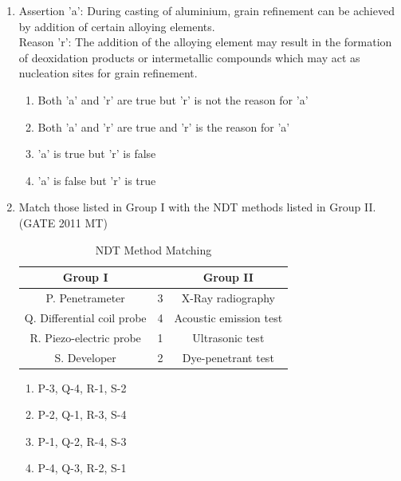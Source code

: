 \documentclass[12pt]{article}
\begin{document}
\begin{enumerate}
\item Assertion 'a': During casting of aluminium, grain refinement can be achieved by addition of certain alloying elements. \\
Reason 'r': The addition of the alloying element may result in the formation of deoxidation products or intermetallic compounds which may act as nucleation sites for grain refinement.
    \begin{enumerate}
        \item Both 'a' and 'r' are true but 'r' is not the reason for 'a'
        \item Both 'a' and 'r' are true and 'r' is the reason for 'a'
        \item 'a' is true but 'r' is false
        \item 'a' is false but 'r' is true
    \end{enumerate}

\item Match those listed in Group I with the NDT methods listed in Group II.(GATE 2011 MT)
\begin{table}[h]
\centering
\caption{NDT Method Matching}
\begin{tabular}{|c|c|c|}
\hline
\textbf{Group I} & & \textbf{Group II} \\
\hline
P. Penetrameter & 3 & X-Ray radiography \\
Q. Differential coil probe & 4 & Acoustic emission test \\
R. Piezo-electric probe & 1 & Ultrasonic test \\
S. Developer & 2 & Dye-penetrant test \\
\hline
\end{tabular}
\end{table}
\begin{enumerate}[label=(\Alph*)]
    \item P-3, Q-4, R-1, S-2
    \item P-2, Q-1, R-3, S-4
    \item P-1, Q-2, R-4, S-3
    \item P-4, Q-3, R-2, S-1
\end{enumerate}


\end{enumerate}
\end{document}
